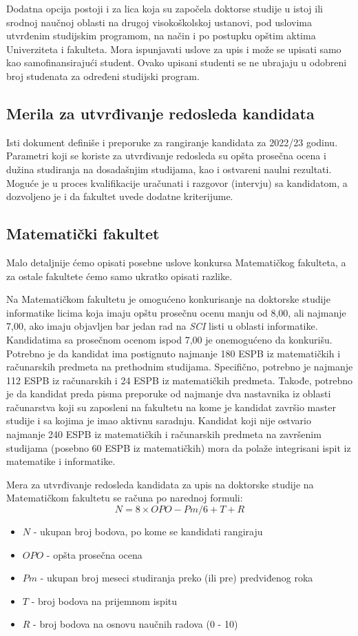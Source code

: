 \documentclass[a4paper]{article}
\begin{document}
Dodatna opcija postoji i za lica koja su započela doktorse studije u istoj ili srodnoj naučnoj oblasti na drugoj visokoškolskoj ustanovi, pod uslovima utvrđenim studijskim programom, na način i po postupku opštim aktima Univerziteta i fakulteta. Mora ispunjavati uslove za upis i može se upisati samo kao samofinansirajući student. Ovako upisani studenti se ne ubrajaju u odobreni broj studenata za određeni studijski program. 

\subsection{Merila za utvrđivanje redosleda kandidata}

Isti dokument\cite{konkursBeograd} definiše i preporuke za rangiranje kandidata za 2022/23 godinu. Parametri koji se koriste za utvrđivanje redosleda su opšta prosečna ocena i dužina studiranja na dosadašnjim studijama, kao i ostvareni naulni rezultati. Moguće je u proces kvalifikacije uračunati i razgovor (intervju) sa kandidatom, a dozvoljeno je i da fakultet uvede dodatne kriterijume. 

\subsection{Matematički fakultet}

Malo detaljnije ćemo opisati posebne uslove konkursa Matematičkog fakulteta\cite{konkursMATF}, a za ostale fakultete ćemo samo ukratko opisati razlike. 

Na Matematičkom fakultetu je omogućeno konkurisanje na doktorske studije informatike licima koja imaju opštu prosečnu ocenu manju od 8,00, ali najmanje 7,00, ako imaju objavljen bar jedan rad na \emph{SCI} listi u oblasti informatike. Kandidatima sa prosečnom ocenom ispod 7,00 je onemogućeno da konkurišu. Potrebno je da kandidat ima postignuto najmanje 180 ESPB iz matematičkih i računarskih predmeta na prethodnim studijama. Specifično, potrebno je najmanje 112 ESPB iz računarskih i 24 ESPB iz matematičkih predmeta. Takođe, potrebno je da kandidat preda pisma preporuke od najmanje dva nastavnika iz oblasti računarstva koji su zaposleni na fakultetu na kome je kandidat završio master studije i sa kojima je imao aktivnu saradnju. Kandidat koji nije ostvario najmanje 240 ESPB iz matematičkih i računarskih predmeta na završenim studijama (posebno 60 ESPB iz matematičkih) mora da polaže integrisani ispit iz matematike i informatike. 

Mera za utvrđivanje redosleda kandidata za upis na doktorske studije na Matematičkom fakultetu\cite{konkursMATF} se računa po narednoj formuli: 
$$N = 8 \times OPO - Pm / 6 + T + R$$
\begin{itemize}
\item
$N$ - ukupan broj bodova, po kome se kandidati rangiraju
\item
$OPO$ - opšta prosečna ocena
\item
$Pm$ - ukupan broj meseci studiranja preko (ili pre) predviđenog roka
\item
$T$ - broj bodova na prijemnom ispitu
\item
$R$ - broj bodova na osnovu naučnih radova (0 - 10)
\end{itemize}
\end{document}
